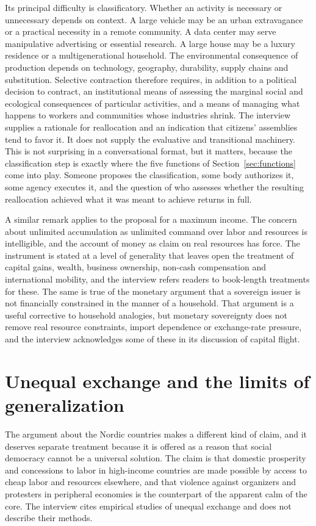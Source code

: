 \documentclass[12pt]{article}
\theoremstyle{definition}
\begin{document}
Its principal difficulty is classificatory. Whether an activity is necessary or unnecessary depends on context. A large vehicle may be an urban extravagance or a practical necessity in a remote community. A data center may serve manipulative advertising or essential research. A large house may be a luxury residence or a multigenerational household. The environmental consequence of production depends on technology, geography, durability, supply chains and substitution. Selective contraction therefore requires, in addition to a political decision to contract, an institutional means of assessing the marginal social and ecological consequences of particular activities, and a means of managing what happens to workers and communities whose industries shrink. The interview supplies a rationale for reallocation and an indication that citizens' assemblies tend to favor it. It does not supply the evaluative and transitional machinery. This is not surprising in a conversational format, but it matters, because the classification step is exactly where the five functions of Section~\ref{sec:functions} come into play. Someone proposes the classification, some body authorizes it, some agency executes it, and the question of who assesses whether the resulting reallocation achieved what it was meant to achieve returns in full.

A similar remark applies to the proposal for a maximum income. The concern about unlimited accumulation as unlimited command over labor and resources is intelligible, and the account of money as claim on real resources has force. The instrument is stated at a level of generality that leaves open the treatment of capital gains, wealth, business ownership, non-cash compensation and international mobility, and the interview refers readers to book-length treatments for these. The same is true of the monetary argument that a sovereign issuer is not financially constrained in the manner of a household. That argument is a useful corrective to household analogies, but monetary sovereignty does not remove real resource constraints, import dependence or exchange-rate pressure, and the interview acknowledges some of these in its discussion of capital flight.

\section{Unequal exchange and the limits of generalization}

The argument about the Nordic countries makes a different kind of claim, and it deserves separate treatment because it is offered as a reason that social democracy cannot be a universal solution. The claim is that domestic prosperity and concessions to labor in high-income countries are made possible by access to cheap labor and resources elsewhere, and that violence against organizers and protesters in peripheral economies is the counterpart of the apparent calm of the core. The interview cites empirical studies of unequal exchange and does not describe their methods.
\end{document}
